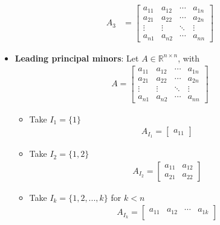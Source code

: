 \documentclass{report}
\begin{document}
\begin{itemize}
\begin{align*}
                        A_{3} &= \begin{bmatrix}
                    a_{11} & a_{12} & \cdots &a_{1n} \\
                    a_{21} & a_{22} & \cdots &a_{2n} \\
                    \vdots & \vdots & \ddots & \vdots \\
                    a_{n1} & a_{n2} & \cdots &a_{nn}
                \end{bmatrix}
            \end{align*}
        \item \textbf{Leading principal minors}: Let $A\in \mathbb{R}^{n\times n}$, with
            \begin{align*}
                A = \begin{bmatrix}
                    a_{11} & a_{12} & \cdots & a_{1n} \\
                    a_{21} & a_{22} & \cdots & a_{2n} \\
                    \vdots & \vdots & \ddots & \vdots \\
                    a_{n1} & a_{n2} & \cdots & a_{nn} 
                \end{bmatrix}
            \end{align*}
            \begin{itemize}
                \item Take $I_{1} = \{1\} $
                    \begin{align*}
                       A_{I_{1}} = \begin{bmatrix} a_{11} \end{bmatrix}
                    \end{align*}
                \item Take $I_{2} = \{1,2\} $
                    \begin{align*}
                        A_{I_{2}} = \begin{bmatrix} a_{11} & a_{12} \\ a_{21} & a_{22} \end{bmatrix}
                    \end{align*}
                \item Take $I_{k} = \{1,2,...,k\} $ for $k < n$
                    \begin{align*}
                        A_{I_{k}} = \begin{bmatrix}
                            a_{11} & a_{12} & \cdots & a_{1k} \\

\end{bmatrix}
\end{align*}
\end{itemize}
\end{itemize}
\end{document}
